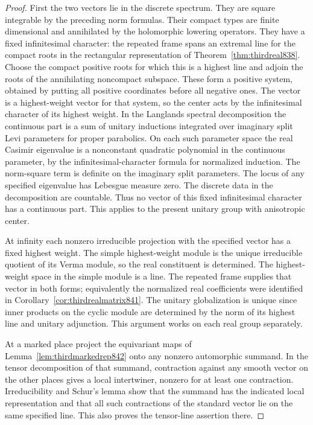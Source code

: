 \documentclass[a4paper,11pt]{article}
\theoremstyle{definition}
\theoremstyle{remark}
\numberwithin{equation}{section}
\begin{document}
\begin{proof}
First the two vectors lie in the discrete spectrum.
They are square integrable by the preceding norm formulas.
Their compact types are finite dimensional and annihilated
by the holomorphic lowering operators. They have a fixed
infinitesimal character: the repeated frame spans an
extremal line for the compact roots in the rectangular
representation of Theorem~\ref{thm:thirdreal838}. Choose the
compact positive roots for which this is a highest line and
adjoin the roots of the annihilating noncompact subspace.
These form a positive system, obtained by putting all
positive coordinates before all negative ones. The vector
is a highest-weight vector for that system, so the center
acts by the infinitesimal character of its highest weight.
In the Langlands spectral decomposition the continuous part
is a sum of unitary inductions integrated over imaginary
split Levi parameters for proper parabolics. On each such
parameter space the real Casimir eigenvalue is a nonconstant
quadratic polynomial in the continuous parameter, by the
infinitesimal-character formula for normalized induction.
The norm-square term is definite on the imaginary split
parameters. The locus of any specified eigenvalue has
Lebesgue measure zero. The discrete data in the decomposition
are countable. Thus no vector of this fixed infinitesimal
character has a continuous part. This applies to the present
unitary group with anisotropic center.

At infinity each nonzero irreducible projection with the
specified vector has a fixed highest weight. The simple
highest-weight module is the unique irreducible quotient
of its Verma module, so the real constituent is determined.
The highest-weight space in the simple module is a line.
The repeated frame supplies that vector in both forms;
equivalently the normalized real coefficients were identified
in Corollary~\ref{cor:thirdrealmatrix841}. The unitary
globalization is unique since inner products on the cyclic
module are determined by the norm of its highest line and
unitary adjunction. This argument works on each real group
separately.

At a marked place project the equivariant maps of
Lemma~\ref{lem:thirdmarkedrep842} onto any nonzero
automorphic summand. In the tensor decomposition of that
summand, contraction against any smooth vector on the other
places gives a local intertwiner, nonzero for at least one
contraction. Irreducibility and Schur's lemma show that the
summand has the indicated local representation and that
all such contractions of the standard vector lie on the
same specified line. This also proves the tensor-line
assertion there.


\end{proof}
\end{document}
